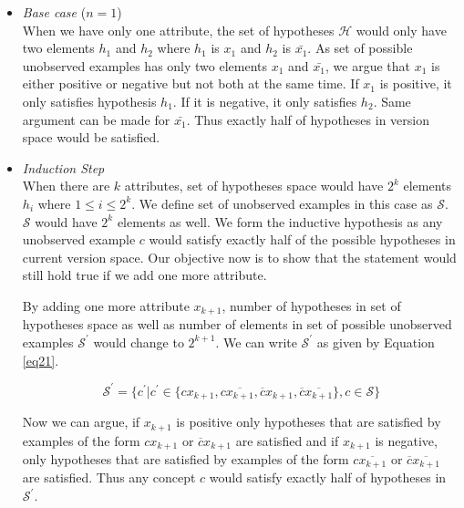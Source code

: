 \begin{itemize}
\item \textit{Base case} ($n = 1$)\\
When we have only one attribute, the set of hypotheses $\mathcal{H}$ would only have two elements $h_1$ and $h_2$ where $h_1$ is $x_1$ and $h_2$ is $\bar{x_1}$.
As set of possible unobserved examples has only two elements $x_1$ and $\bar{x_1}$, we argue that $x_1$ is either positive or negative but not both at the same time.
If $x_1$ is positive, it only satisfies hypothesis $h_1$.
If it is negative, it only satisfies $h_2$.
Same argument can be made for $\bar{x_1}$.
Thus exactly half of hypotheses in version space would be satisfied.

\item \textit{Induction Step}\\
When there are $k$ attributes, set of hypotheses space would have $2^k$ elements $h_i$ where $1 \leq i \leq 2^k$.
We define set of unobserved examples in this case as $\mathcal{S}$.
$\mathcal{S}$ would have $2^k$ elements as well.
We form the inductive hypothesis as any unobserved example $c$ would satisfy exactly half of the possible hypotheses in current version space.
Our objective now is to show that the statement would still hold true if we add one more attribute.

By adding one more attribute $x_{k+1}$, number of hypotheses in set of hypotheses space as well as number of elements in set of possible unobserved examples $\mathcal{S}^{\prime}$ would change to $2^{k+1}$.
We can write $\mathcal{S}^{\prime}$ as given by Equation \ref{eq21}.

\begin{equation}\label{eq21}
\mathcal{S}^{\prime} = \{c^{\prime} | c^{\prime} \in \{cx_{k+1}, c\overline{x_{k+1}}, \overline{c}x_{k+1}, \overline{c}\overline{x_{k+1}}\}, c \in \mathcal{S} \}
\end{equation}

Now we can argue, if $x_{k+1}$ is positive only hypotheses that are satisfied by examples of the form $cx_{k+1}$ or $\overline{c}x_{k+1}$ are satisfied and if $x_{k+1}$ is negative, only hypotheses that are satisfied by examples of the form $c\overline{x_{k+1}}$ or $\overline{c}\overline{x_{k+1}}$ are satisfied.
Thus any concept $c$ would satisfy exactly half of hypotheses in $\mathcal{S}^{\prime}$.

\end{itemize}
